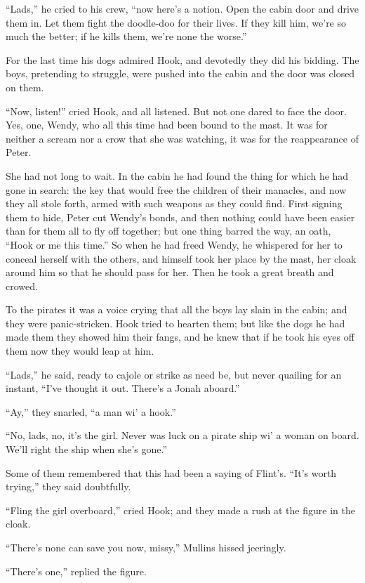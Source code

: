 “Lads,” he cried to his crew, “now here’s a notion.
Open the cabin door and drive them in.
Let them fight the doodle-doo for their lives.
If they kill him, we’re so much the better;
if he kills them, we’re none the worse.”

For the last time his dogs admired Hook,
and devotedly they did his bidding.
The boys, pretending to struggle,
were pushed into the cabin and the door was closed on them.

“Now, listen!\@” cried Hook, and all listened.
But not one dared to face the door.
Yes, one, Wendy, who all this time had been bound to the mast.
It was for neither a scream nor a crow that she was watching,
it was for the reappearance of Peter.

She had not long to wait.
In the cabin he had found the thing for which he had gone in search:
the key that would free the children of their manacles,
and now they all stole forth, armed with such weapons as they could find.
First signing them to hide, Peter cut Wendy’s bonds,
and then nothing could have been easier than for them all to fly off together;
but one thing barred the way, an oath, “Hook or me this time.”
So when he had freed Wendy, he whispered for her to conceal herself with the others,
and himself took her place by the mast, her cloak around him so that he should pass for her.
Then he took a great breath and crowed.

To the pirates it was a voice crying that all the boys lay slain in the cabin;
and they were panic-stricken.
Hook tried to hearten them;
but like the dogs he had made them they showed him their fangs,
and he knew that if he took his eyes off them now they would leap at him.

“Lads,” he said, ready to cajole or strike as need be,
but never quailing for an instant, “I’ve thought it out.
There’s a Jonah aboard.”

“Ay,” they snarled, “a man wi’ a hook.”

“No, lads, no, it’s the girl.
Never was luck on a pirate ship wi’ a woman on board.
We’ll right the ship when she’s gone.”

Some of them remembered that this had been a saying of Flint’s.
“It’s worth trying,” they said doubtfully.

“Fling the girl overboard,” cried Hook;
and they made a rush at the figure in the cloak.

“There’s none can save you now, missy,” Mullins hissed jeeringly.

“There’s one,” replied the figure.

